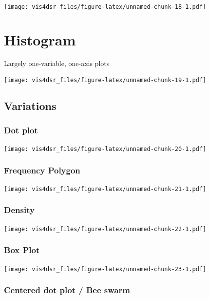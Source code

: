 \documentclass[
]{krantz}
\begin{document}
\texttt{[image: vis4dsr\_files/figure-latex/unnamed-chunk-18-1.pdf]}

\hypertarget{histogram}{%
\section{Histogram}\label{histogram}}

Largely one-variable, one-axis plots

\texttt{[image: vis4dsr\_files/figure-latex/unnamed-chunk-19-1.pdf]}

\hypertarget{variations-5}{%
\subsection{Variations}\label{variations-5}}

\hypertarget{dot-plot}{%
\subsubsection{Dot plot}\label{dot-plot}}

\texttt{[image: vis4dsr\_files/figure-latex/unnamed-chunk-20-1.pdf]}

\hypertarget{frequency-polygon}{%
\subsubsection{Frequency Polygon}\label{frequency-polygon}}

\texttt{[image: vis4dsr\_files/figure-latex/unnamed-chunk-21-1.pdf]}

\hypertarget{density}{%
\subsubsection{Density}\label{density}}

\texttt{[image: vis4dsr\_files/figure-latex/unnamed-chunk-22-1.pdf]}

\hypertarget{box-plot}{%
\subsubsection{Box Plot}\label{box-plot}}

\texttt{[image: vis4dsr\_files/figure-latex/unnamed-chunk-23-1.pdf]}

\hypertarget{centered-dot-plot-bee-swarm}{%
\subsubsection{Centered dot plot / Bee swarm}\label{centered-dot-plot-bee-swarm}}
\end{document}
